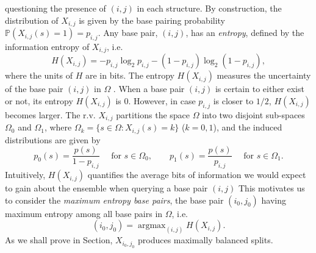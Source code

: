 \documentclass[preprint,authoryear]{elsarticle}
\DeclareMathOperator*{\argmax}{argmax} %
\begin{document}
questioning the presence of  $(i,j)$ in each structure.
By construction, the distribution of $X_{i,j}$ is given by the base pairing probability 
$\mathbb{P}(X_{i,j}(s)=1)=p_{i,j}$.
Any base pair, $(i,j)$, has an \emph{entropy}, defined by the information entropy of
$X_{i,j}$, i.e. 
\[
H(X_{i,j})=-p_{i,j}  \log_2 p_{i,j}  -(1-p_{i,j} )  \log_2 (1-p_{i,j} ),
\]
where the units of $H$ are in bits. The entropy $H(X_{i,j}) $ measures the uncertainty of  the base
pair $(i,j)$ in $\Omega$ . When a base pair $(i,j)$  is certain to either exist or not, its entropy
$H(X_{i,j})$ is $0$. However, in case $p_{i,j} $ is closer to $1/2$, $H(X_{i,j})$ becomes larger.
The r.v. $X_{i,j}$ partitions the space $\Omega$ into two disjoint sub-spaces $\Omega_0$ and
$\Omega_1$, where  $ \Omega_k=\{s\in  \Omega :X_{i,j}(s)=k\}$ ($k=0,1$), 
and the induced distributions are given by
\[
p_0(s)=\frac{p(s)}{1-p_{i,j}} \quad \text{ for } s\in  \Omega_0,\qquad
p_1(s)=\frac{p(s)}{p_{i,j}} \quad \text{ for } s\in  \Omega_1.
\]
Intuitively, $H(X_{i,j}) $ quantifies the average bits of information
we would expect to gain about the ensemble when querying a   base pair $(i,j)$  
This motivates  us to consider the \emph{maximum entropy base pairs}, the base pair $(i_0,j_0)$
having  maximum entropy among all base pairs in $\Omega$, i.e. 
\[
(i_0,j_0)= \argmax_{(i,j)}  H(X_{i,j}).
\]
As we shall prove in Section, $X_{i_0,j_0}$ produces maximally balanced
splits.
        
\end{document}
